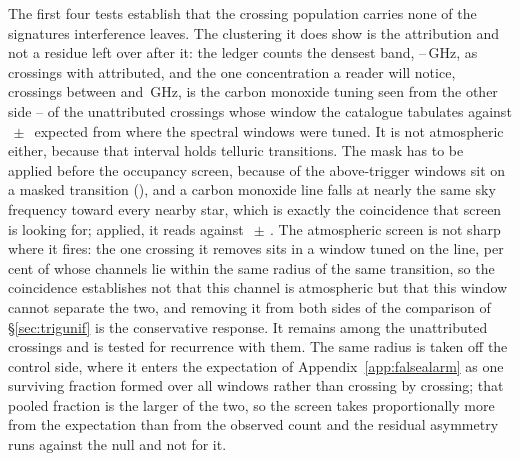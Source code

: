 The first four tests establish that the crossing population carries none of
the signatures interference leaves. The clustering it does show is the
attribution and not a residue left over after it: the ledger counts the
densest band, \AppMBandLo--\AppMBandHi\,GHz, as \EvTubeLedgerN{} crossings
with \EvTubeLedgerAttr{} attributed, and the one concentration a reader will
notice, \TlBandAll{} crossings between \TlBandLo{} and \TlBandHi\,GHz, is the
carbon monoxide tuning seen from the other side -- \TlBandObs{} of the
\TlBandNSub{} unattributed crossings whose window the catalogue tabulates
against \TlBandNull$\,\pm\,$\TlBandNullSd{} expected from where the spectral
windows were tuned. It is not atmospheric either, because that interval
holds \TlBandNLine{} telluric transitions. The mask has to be applied before the
occupancy screen, because \RfiOccMaskN{} of the \RfiOccSigN{} above-trigger
windows sit on a masked transition (\RfiOccSpeciesList), and a carbon
monoxide line falls at nearly the same sky frequency toward every nearby
star, which is exactly the coincidence that screen is looking for; applied,
it reads \RfiOccMskObs{} against
\RfiOccMskNull$\,\pm\,$\RfiOccMskNullSd. The atmospheric screen is not sharp
where it fires: the one crossing it removes sits in a window tuned on the
line, \ScNearWinPct{} per cent of whose channels lie within the same radius
of the same transition, so the coincidence establishes not that this channel
is atmospheric but that this window cannot separate the two, and removing it
from both sides of the comparison of \S\ref{sec:trigunif} is the
conservative response. It remains among the \MkUnattr{} unattributed
crossings and is tested for recurrence with them. The same radius is taken off the control side,
where it enters the expectation of Appendix~\ref{app:falsealarm} as one
surviving fraction formed over all windows rather than crossing by crossing;
that pooled fraction is the larger of the two, so the screen takes
proportionally more from the expectation than from the observed count and the
residual asymmetry runs against the null and not for it.

